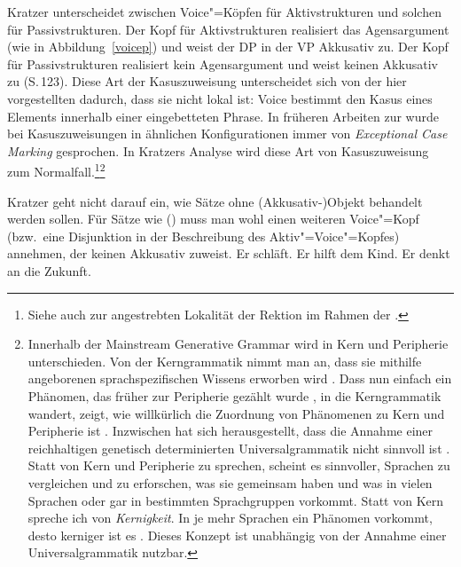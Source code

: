 {Kratzer unterscheidet
zwischen Voice"=Köpfen für Aktivstrukturen und solchen für Passivstrukturen. Der Kopf
für Aktivstrukturen realisiert das Agensargument (wie in Abbildung~\ref{voicep}) und
weist der DP in der VP Akkusativ zu. Der Kopf für Passivstrukturen realisiert
kein Agensargument und weist keinen Akkusativ zu (S.\,123). Diese Art der Kasuszuweisung
unterscheidet sich von der hier vorgestellten dadurch, dass sie nicht lokal ist: Voice
bestimmt den Kasus eines Elements innerhalb einer eingebetteten Phrase. In früheren
Arbeiten zur \gb wurde bei Kasuszuweisungen in ähnlichen Konfigurationen immer von
\emph{Exceptional Case Marking} gesprochen. In Kratzers Analyse wird diese Art von
Kasuszuweisung zum Normalfall.\footnote{
  Siehe auch  zur angestrebten Lokalität der Rektion im Rahmen der \gbt.
}\footnote{%
Innerhalb der Mainstream Generative Grammar wird in Kern und Peripherie unterschieden. Von der
Kerngrammatik nimmt man an, dass sie mithilfe angeborenen sprachspezifischen Wissens erworben wird
\citep[7--8]{Chomsky81a}. Dass nun einfach ein Phänomen, das früher zur Peripherie gezählt wurde
\parencites[70]{Chomsky81a}[13, 48]{Hyams88a-u}, in die Kerngrammatik wandert, zeigt, wie
willkürlich die Zuordnung von Phänomenen zu Kern und Peripherie ist
\citep{MuellerKernigkeit}. Inzwischen hat sich herausgestellt, dass die Annahme einer reichhaltigen
genetisch determinierten Universalgrammatik nicht sinnvoll ist \citep[Kapitel~13]{MuellerGT-Eng5}. Statt von
Kern und Peripherie zu sprechen, scheint es sinnvoller, Sprachen zu vergleichen und zu erforschen,
was sie gemeinsam haben und was in vielen Sprachen oder gar in bestimmten Sprachgruppen
vorkommt. Statt von Kern spreche ich von \emph{Kernigkeit}. In je mehr Sprachen ein Phänomen vorkommt,
desto kerniger ist es \citep{MuellerKernigkeit}. Dieses Konzept ist unabhängig von der Annahme einer
Universalgrammatik nutzbar.}

Kratzer geht nicht darauf ein, wie Sätze ohne (Akkusativ-)Objekt behandelt werden sollen. Für
Sätze wie () muss man wohl einen weiteren Voice"=Kopf (bzw.\ eine Disjunktion
in der Beschreibung des Aktiv"=Voice"=Kopfes) annehmen, der keinen Akkusativ zuweist.
\eal
\ex Er schläft.
\ex Er hilft dem Kind.
\ex Er denkt an die Zukunft.
\zl

}
